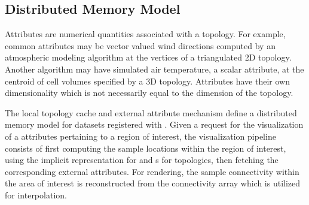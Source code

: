 \subsection{Distributed Memory Model}
Attributes are numerical quantities associated with a topology. For
example, common attributes may be vector valued wind directions computed by an
atmospheric modeling algorithm at the vertices of a triangulated 2D
topology. Another algorithm may have simulated air temperature,
a scalar attribute, at the centroid of cell volumes specified by a 3D
topology. Attributes have their own dimensionality which is not
necessarily equal to the dimension of the topology.

The local topology cache and external attribute mechanism define a
distributed memory model for datasets registered with \sciwms{}. Given
a request for the visualization of a attributes pertaining to a region
of interest, the visualization pipeline consists of first computing
the sample locations within the region of interest, using the
implicit representation for \cgrid{} and \rtree{}s for \ugrid{}
topologies, then fetching the corresponding external attributes. For
rendering, the sample connectivity within the area of interest is
reconstructed from the connectivity array which is utilized for
interpolation.
